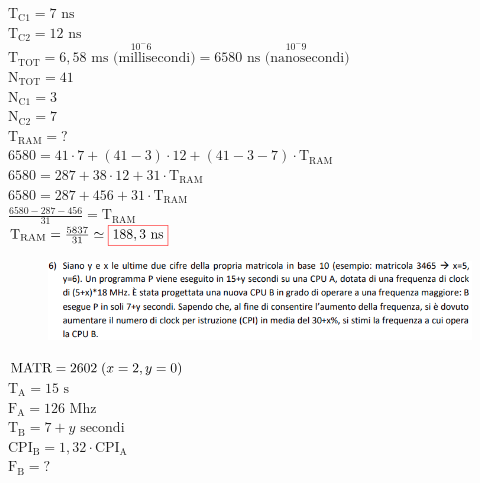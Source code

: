 $ \text{T}_\text{C1} = 7 \text{ ns} $ \\
$ \text{T}_\text{C2} = 12 \text{ ns} $ \\
$ \text{T}_\text{TOT} = 6,58 \overset{10^-6}{\text{ ms (millisecondi)}} = 6580 \overset{10^-9}{\text{ ns (nanosecondi)}} $ \\

$ \text{N}_\text{TOT} = 41 $ \\
$ \text{N}_\text{C1} = 3 $ \\
$ \text{N}_\text{C2} = 7 $ \\
$ \text{T}_\text{RAM} = ? $ \\

$ 6580 = 41 \cdot 7 + (41 - 3) \cdot 12 + (41 - 3 - 7) \cdot \text{T}_\text{RAM} $ \\
$ 6580 = 287 + 38 \cdot 12 + 31 \cdot \text{T}_\text{RAM} $ \\
$ 6580 = 287 + 456 + 31 \cdot \text{T}_\text{RAM} $ \\

$ \frac{6580 - 287 - 456}{31} = \text{T}_\text{RAM} $ \\

$ \text{T}_\text{RAM} = \frac{5837}{31} \simeq \color{red}\boxed{\normalcolor188,3 \text{ ns}} $ \\


\newpage

\begin{figure}[ht]
	\includegraphics[width=1\linewidth]{es6_MiglioramentoPrestazioneMemoria}
	\label{fig:es6MiglioramentoPrestazioneMemoria}
\end{figure}

$ \text{MATR} = 2602 \hspace{.1cm}(x = 2, y = 0) $ \\

$ \text{T}_\text{A} = 15 \text{ s} $ \\
$ \text{F}_\text{A} = 126 \text{ Mhz} $ \\
$ \text{T}_\text{B} = 7 + y \text{ secondi} $ \\
$ \text{CPI}_\text{B} = 1,32 \cdot \text{CPI}_\text{A} $ \\
$ \text{F}_\text{B} = ? $ \\

